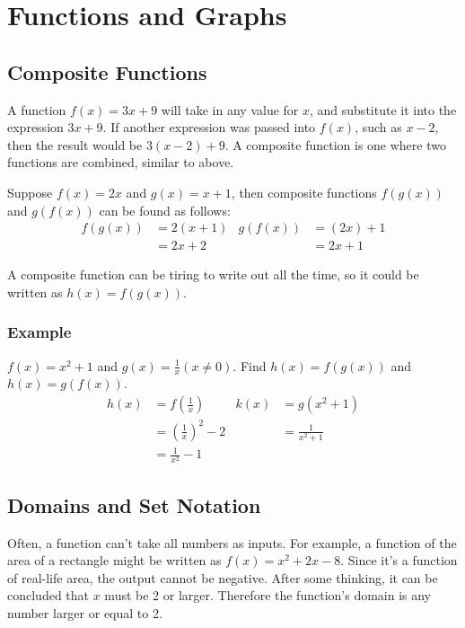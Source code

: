 \newcommand{\N}{\mathbb{N}}
\newcommand{\Z}{\mathbb{Z}}
\newcommand{\Q}{\mathbb{Q}}
\newcommand{\R}{\mathbb{R}}
\newcommand{\C}{\mathbb{C}}

\chapter{Functions and Graphs}
\section{Composite Functions}
A function $f(x) = 3x+9$ will take in any value for $x$, and substitute it into the expression $3x+9$. If another expression was passed into $f(x)$, such as $x-2$, then the result would be $3(x-2)+9$. A composite function is one where two functions are combined, similar to above.

Suppose $f(x) = 2x$ and $g(x) = x+1$, then composite functions $f(g(x))$ and $g(f(x))$ can be found as follows:
\begin{align*}
	f(g(x)) &= 2(x+1) & g(f(x)) &= (2x)+1\\
	&=2x+2 & &=2x+1
\end{align*}

A composite function can be tiring to write out all the time, so it could be written as $h(x)=f(g(x))$.

\subsection{Example}
$f(x)=x^2+1$ and $g(x)=\frac{1}{x} \left(x\neq0\right)$. Find $h(x)=f(g(x))$ and $h(x)=g(f(x))$.
\begin{align*}
	h(x)&=f\left(\frac{1}{x}\right) & k(x)&=g\left(x^2+1\right)\\
	&=\left(\frac{1}{x}\right)^2-2 & &=\frac{1}{x^2+1}\\
	&=\frac{1}{x^2}-1
\end{align*}


\section{Domains and Set Notation}
Often, a function can't take all numbers as inputs. For example, a function of the area of a rectangle might be written as $f(x)=x^2+2x-8$. Since it's a function of real-life area, the output cannot be negative. After some thinking, it can be concluded that $x$ must be 2 or larger. Therefore the function's domain is any number larger or equal to 2.


